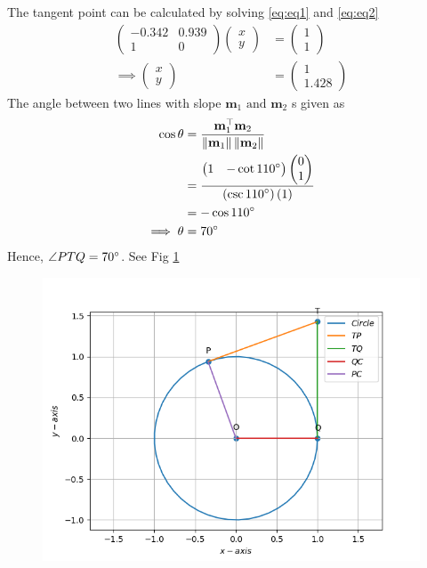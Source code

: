 \documentclass[12pt]{article}
\providecommand{\brak}[1]{\ensuremath{\left(#1\right)}}
\providecommand{\norm}[1]{\left\lVert#1\right\rVert}
\newcommand{\myvec}[1]{\ensuremath{\begin{pmatrix}#1\end{pmatrix}}}
\let\vec\mathbf
\begin{document}
The tangent point can be calculated by solving \eqref{eq:eq1} and \eqref{eq:eq2}
\begin{align}
	\myvec{-0.342&0.939\\1&0}\myvec{x\\y} &= \myvec{1\\1}\\
	\implies \myvec{x\\y} &= \myvec{1\\1.428}
\end{align}
The angle between two lines with slope $\vec{m}_1 \text{ and } \vec{m}_2$ s given as
\begin{align}
	\cos\theta &= \frac{\vec{m}_1^\top\vec{m}_2}{\norm{\vec{m}_1}\norm{\vec{m}_2}}\\
	&= \frac{\myvec{1&-\cot{110}\degree}\myvec{0\\1}}{\brak{\csc{110}\degree}\brak{1}}\\
	&= -\cos{110}\degree\\
	\implies \theta &= 70\degree
\end{align}
Hence, $\angle{PTQ} = 70\degree$. See Fig \ref{fig:Fig1}
\begin{figure}[!h]
	\begin{center} 
	    \includegraphics[width=\columnwidth]{figs/tangent2}
	\end{center}
\caption{}
\label{fig:Fig1}
\end{figure}
\end{document}
